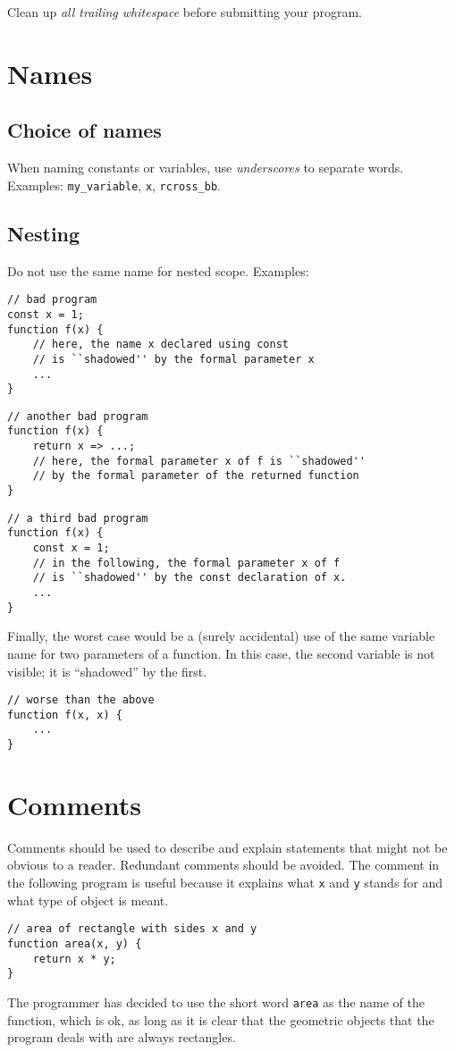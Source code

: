   Clean up \emph{all trailing whitespace} before submitting your program.

\section*{Names}
\subsection*{Choice of names}
When naming constants or variables,
use \emph{underscores} to separate words.
Examples: \lstinline{my_variable}, \lstinline{x}, \lstinline{rcross_bb}.

\subsection*{Nesting}
Do not use the same name for nested scope. Examples:
\begin{lstlisting}
// bad program
const x = 1;
function f(x) {
    // here, the name x declared using const
    // is ``shadowed'' by the formal parameter x
    ...
}
\end{lstlisting}

\begin{lstlisting}
// another bad program
function f(x) {
    return x => ...;
    // here, the formal parameter x of f is ``shadowed'' 
    // by the formal parameter of the returned function
}
\end{lstlisting}

\begin{lstlisting}
// a third bad program
function f(x) {
    const x = 1;
    // in the following, the formal parameter x of f
    // is ``shadowed'' by the const declaration of x.
    ...
}
\end{lstlisting}
Finally, the worst case would be a (surely accidental) 
use of the same variable name for two parameters of a function.
In this case, the second variable is not visible; it is ``shadowed''
by the first.
\begin{lstlisting}
// worse than the above
function f(x, x) {
    ...
}
\end{lstlisting}

\section*{Comments}
Comments should be used to describe and explain statements 
that might not be obvious to a reader.
Redundant comments should be avoided. The comment in the following program is useful
because it explains what \lstinline{x} and \lstinline{y} stands for and what type of
object is meant. 
\begin{lstlisting}
// area of rectangle with sides x and y
function area(x, y) {
    return x * y;
}
\end{lstlisting}
The programmer has decided to use the short word \lstinline{area} as the name of the function,
which is ok, as long as it is clear that the geometric objects that the program deals with
are always rectangles.

